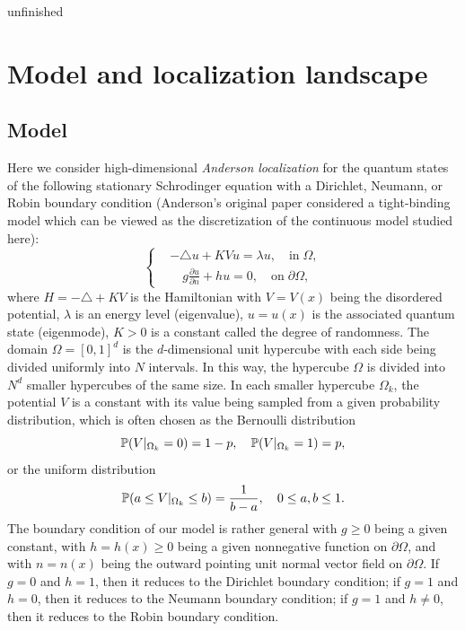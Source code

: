 \documentclass[a4paper,11pt]{article}
\begin{document}
{\color{red} unfinished}

\section{Model and localization landscape}\label{model}

\subsection{Model}

Here we consider high-dimensional \emph{Anderson localization} for the quantum states of the following stationary Schrodinger equation with a Dirichlet, Neumann, or Robin boundary condition (Anderson's original paper \cite{chen2004markov} considered a tight-binding model which can be viewed as the discretization of the continuous model studied here):
\begin{equation}\label{anderson}
\left\{
\begin{split}
& -\triangle u + K V u = \lambda u, \quad \textrm{in} \; \Omega, \\
& \quad g \frac{\partial u}{\partial n} + h u = 0, \quad \textrm{on} \; \partial  \Omega,
\end{split}
\right.
\end{equation}
where $H = -\triangle + K V$ is the Hamiltonian with $V = V(x)$ being the disordered potential, $\lambda$ is an energy level (eigenvalue), $u = u(x)$ is the associated quantum state (eigenmode), $K > 0$ is a constant called the degree of randomness. The domain $\Omega = [0,1]^d$ is the $d$-dimensional unit hypercube with each side being divided uniformly into $N$ intervals. In this way, the hypercube $\Omega$ is divided into $N^d$ smaller hypercubes of the same size. In each smaller hypercube $\Omega_k$, the potential $V$ is a constant with its value being sampled from a given probability distribution, which is often chosen as the Bernoulli distribution
\begin{equation}\label{bernoulli}
\mathbb{P}(V|_{\Omega_k} = 0) = 1-p, \quad \mathbb{P}(V|_{\Omega_k} = 1) = p,
\end{equation}
or the uniform distribution
\begin{equation}\label{uniform}
\mathbb{P}(a \leq V|_{\Omega_k} \leq b) = \frac{1}{b-a}, \quad 0 \leq a, b \leq 1.
\end{equation}
The boundary condition of our model is rather general with $g \geq 0$ being a given constant, with $h = h(x) \geq 0$ being a given nonnegative function on $\partial \Omega$, and with $n = n(x)$ being the outward pointing unit normal vector field on $\partial \Omega$. If $g = 0$ and $h = 1$, then it reduces to the Dirichlet boundary condition; if $g = 1$ and $h = 0$, then it reduces to the Neumann boundary condition; if $g = 1$ and $h\neq 0$, then it reduces to the Robin boundary condition.
\end{document}

